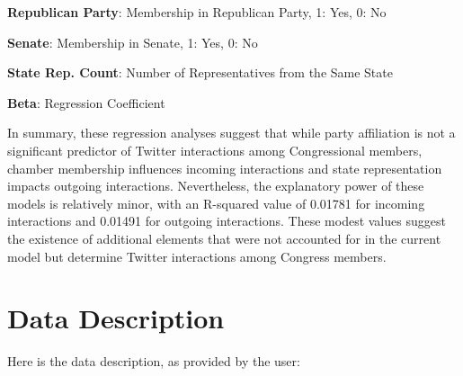 \documentclass[11pt]{article}
\begin{document}
\begin{table}[h]
\caption{Regression results for variables predicting outgoing interactions}
\label{table:outgoing_interactions}
\begin{threeparttable}
\renewcommand{\TPTminimum}{\linewidth}
\begin{tablenotes}
\footnotesize
\item \textbf{Republican Party}: Membership in Republican Party, 1: Yes, 0: No
\item \textbf{Senate}: Membership in Senate, 1: Yes, 0: No
\item \textbf{State Rep. Count}: Number of Representatives from the Same State
\item \textbf{Beta}: Regression Coefficient
\end{tablenotes}
\end{threeparttable}
\end{table}


In summary, these regression analyses suggest that while party affiliation is not a significant predictor of Twitter interactions among Congressional members, chamber membership influences incoming interactions and state representation impacts outgoing interactions. Nevertheless, the explanatory power of these models is relatively minor, with an R-squared value of 0.01781 for incoming interactions and 0.01491 for outgoing interactions. These modest values suggest the existence of additional elements that were not accounted for in the current model but determine Twitter interactions among Congress members.


\clearpage
\appendix

\section{Data Description} \label{sec:data_description} Here is the data description, as provided by the user:
\end{document}

